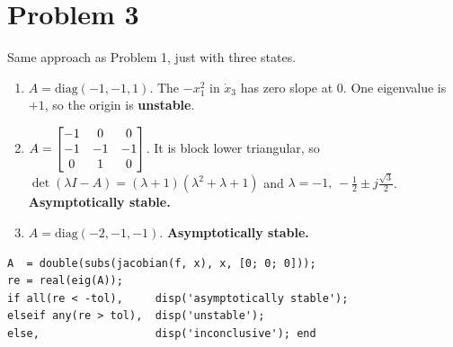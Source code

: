 \section*{Problem 3}

Same approach as Problem 1, just with three states.

\begin{enumerate}
\item $A=\mathrm{diag}(-1,-1,1)$. The $-x_1^2$ in $\dot x_3$ has zero slope at $0$. One eigenvalue is $+1$, so the origin is \textbf{unstable}.
\item $A=\begin{bmatrix}-1&0&0\\-1&-1&-1\\0&1&0\end{bmatrix}$. It is block lower triangular, so $\det(\lambda I-A)=(\lambda+1)(\lambda^2+\lambda+1)$ and $\lambda=-1,\,-\tfrac12\pm j\tfrac{\sqrt3}{2}$. \textbf{Asymptotically stable.}
\item $A=\mathrm{diag}(-2,-1,-1)$. \textbf{Asymptotically stable.}
\end{enumerate}

\begin{lstlisting}
A  = double(subs(jacobian(f, x), x, [0; 0; 0]));
re = real(eig(A));
if all(re < -tol),     disp('asymptotically stable');
elseif any(re > tol),  disp('unstable');
else,                  disp('inconclusive'); end
\end{lstlisting}
